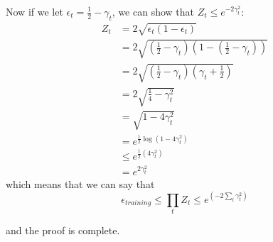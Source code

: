 \documentclass{article}
\begin{document}
Now if we let $\epsilon_t = \frac{1}{2} - \gamma_t$, we can show that $Z_t \leq
e^{-2\gamma_t^2}$:
\begin{align*}
    Z_t &= 2\sqrt{\epsilon_t(1-\epsilon_t)} \tag{Using the previously derived expression for $Z_t$}\\
    &= 2\sqrt{\left(\frac{1}{2} - \gamma_t\right)\left(1-\left(\frac{1}{2} - \gamma_t\right)\right)} \\
    &= 2\sqrt{\left(\frac{1}{2} - \gamma_t\right)\left(\gamma_t + \frac{1}{2}\right)} \\
    &= 2\sqrt{\frac{1}{4} - \gamma_t^2} \\
    &= \sqrt{1 - 4\gamma_t^2} \\
    &= e^{\frac{1}{2}\log(1 - 4\gamma_t^2)} \\
    &\leq e^{\frac{1}{2}(4\gamma_t^2)} \\
    &= e^{2\gamma_t^2}
\end{align*}
which means that we can say that
\begin{equation*}
    \epsilon_{training} \leq \prod_tZ_t \leq e^{(-2\sum_t\gamma_t^2)}
\end{equation*}

and the proof is complete.
\end{document}
